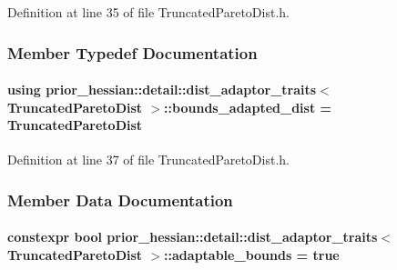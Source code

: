 Definition at line 35 of file Truncated\+Pareto\+Dist.\+h.



\subsubsection{Member Typedef Documentation}
\paragraph[{\texorpdfstring{bounds\+\_\+adapted\+\_\+dist}{bounds_adapted_dist}}]{\setlength{\rightskip}{0pt plus 5cm}using {\bf prior\+\_\+hessian\+::detail\+::dist\+\_\+adaptor\+\_\+traits}$<$ {\bf Truncated\+Pareto\+Dist} $>$\+::{\bf bounds\+\_\+adapted\+\_\+dist} =  {\bf Truncated\+Pareto\+Dist}}\hypertarget{structprior__hessian_1_1detail_1_1dist__adaptor__traits_3_01TruncatedParetoDist_01_4_a7f9f630089f2f3d15823d8115d4dc61b}{}\label{structprior__hessian_1_1detail_1_1dist__adaptor__traits_3_01TruncatedParetoDist_01_4_a7f9f630089f2f3d15823d8115d4dc61b}


Definition at line 37 of file Truncated\+Pareto\+Dist.\+h.



\subsubsection{Member Data Documentation}
\paragraph[{\texorpdfstring{adaptable\+\_\+bounds}{adaptable_bounds}}]{\setlength{\rightskip}{0pt plus 5cm}constexpr bool {\bf prior\+\_\+hessian\+::detail\+::dist\+\_\+adaptor\+\_\+traits}$<$ {\bf Truncated\+Pareto\+Dist} $>$\+::adaptable\+\_\+bounds = true\hspace{0.3cm}{\ttfamily [static]}}\hypertarget{structprior__hessian_1_1detail_1_1dist__adaptor__traits_3_01TruncatedParetoDist_01_4_a79ae0c57937455992ff8394887808474}{}\label{structprior__hessian_1_1detail_1_1dist__adaptor__traits_3_01TruncatedParetoDist_01_4_a79ae0c57937455992ff8394887808474}


